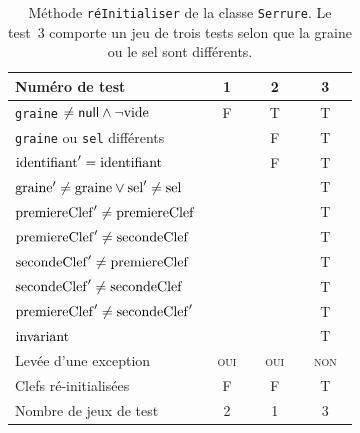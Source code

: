 \documentclass[11pt,article]{article}
\newcommand{\nullvalue}{\textsf{null}\xspace}
\newcommand{\emptyvalue}{\ensuremath\mathrm{vide}}
\newcommand{\invariant}{\ensuremath\mathrm{invariant}}
\begin{document}
\begin{table}[!ht]
\begin{center}
\begin{tabular}{|p{0.4\linewidth}|c|c|c|}
\hline
Numéro de test
&1&2&3\\
\hline
\hline
\texttt{graine} $\neq \nullvalue \land \neg \emptyvalue$
&F&T&T\\
\hline
\texttt{graine} ou \texttt{sel} différents
& &F&T\\
\hline
\hline
$\mathrm{identifiant}' = \mathrm{identifiant}$
& &F&T\\
\hline
$\mathrm{graine}' \neq \mathrm{graine} \lor \mathrm{sel}' \neq \mathrm{sel}$
& & &T\\
\hline
$\mathrm{premiereClef}' \neq \mathrm{premiereClef}$
& & &T\\
\hline
$\mathrm{premiereClef}' \neq \mathrm{secondeClef}$
& & &T\\
\hline
$\mathrm{secondeClef}' \neq \mathrm{premiereClef}$
& & &T\\
\hline
$\mathrm{secondeClef}' \neq \mathrm{secondeClef}$
& & &T\\
\hline
$\mathrm{premiereClef}' \neq \mathrm{secondeClef}'$
& & &T\\
\hline
$\invariant$
& & &T\\
\hline
Levée d'une exception&\textsc{oui}&\textsc{oui}&\textsc{non}\\
\hline
\hline
Clefs ré-initialisées
&F&F&T\\
\hline
\hline
Nombre de jeux de test 
&2&1&3\\
\hline
\end{tabular}
\caption{Méthode \texttt{réInitialiser} de la classe
  \texttt{Serrure}. Le test~3 comporte un jeu de trois tests selon
  que la graine ou le sel sont différents.}
\end{center}
\end{table}
\end{document}

